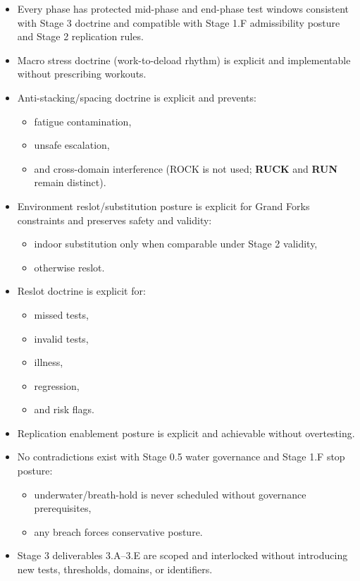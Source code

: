 \documentclass[10pt]{article}
\begin{document}
\begin{itemize}
\item Every phase has protected mid-phase and end-phase test windows consistent with Stage 3 doctrine and compatible with Stage 1.F admissibility posture and Stage 2 replication rules.
\item Macro stress doctrine (work-to-deload rhythm) is explicit and implementable without prescribing workouts.
\item Anti-stacking/spacing doctrine is explicit and prevents:
  \begin{itemize}
  \item fatigue contamination,
  \item unsafe escalation,
  \item and cross-domain interference (ROCK is not used; \textbf{RUCK} and \textbf{RUN} remain distinct).
  \end{itemize}
\item Environment reslot/substitution posture is explicit for Grand Forks constraints and preserves safety and validity:
  \begin{itemize}
  \item indoor substitution only when comparable under Stage 2 validity,
  \item otherwise reslot.
  \end{itemize}
\item Reslot doctrine is explicit for:
  \begin{itemize}
  \item missed tests,
  \item invalid tests,
  \item illness,
  \item regression,
  \item and risk flags.
  \end{itemize}
\item Replication enablement posture is explicit and achievable without overtesting.
\item No contradictions exist with Stage 0.5 water governance and Stage 1.F stop posture:
  \begin{itemize}
  \item underwater/breath-hold is never scheduled without governance prerequisites,
  \item any breach forces conservative posture.
  \end{itemize}
\item Stage 3 deliverables 3.A–3.E are scoped and interlocked without introducing new tests, thresholds, domains, or identifiers.
\end{itemize}
\end{document}
